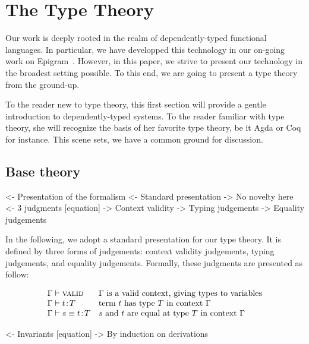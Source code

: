 \section{The Type Theory}

Our work is deeply rooted in the realm of dependently-typed functional
languages. In particular, we have developped this technology in our
on-going work on Epigram~\cite{pigs:epigram}. However, in this paper,
we strive to present our technology in the broadest setting
possible. To this end, we are going to present a type theory from the
ground-up.

To the reader new to type theory, this first section will provide a
gentle introduction to dependently-typed systems. To the reader
familiar with type theory, she will recognize the basis of her
favorite type theory, be it Agda or Coq for instance. This scene sets,
we have a common ground for discussion.

\subsection{Base theory}

\begin{wstructure}
<- Presentation of the formalism
    <- Standard presentation
        -> No novelty here
    <- 3 judgments [equation]
        -> Context validity
        -> Typing judgements
        -> Equality judgements
\end{wstructure}

In the following, we adopt a standard presentation for our type
theory. It is defined by three forms of judgements: context validity
judgements, typing judgements, and equality judgements. Formally,
these judgments are presented as follow:

\[
\begin{array}{ll}
\Gamma \vdash \textsc{valid}                & \mbox{\(\Gamma\) is a valid context, giving types to variables} \\
\Gamma \vdash t\!:\!T           & \mbox{term \(t\) has type \(T\) in context \(\Gamma\)} \\
\Gamma \vdash s \equiv t\!:\!T  & \mbox{\(s\) and \(t\) are equal at type \(T\) in context \(\Gamma\)} \\
\end{array}
\]

\begin{wstructure}
    <- Invariants [equation]
        -> By induction on derivations
\end{wstructure}

